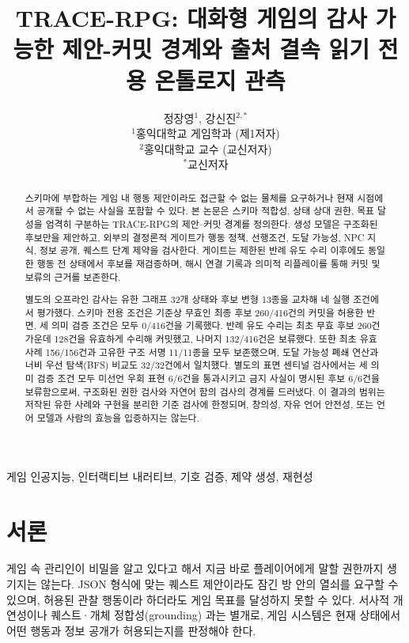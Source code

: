 \documentclass[journal]{IEEEtran}
\title{TRACE-RPG: 대화형 게임의 감사 가능한 제안-커밋 경계와 출처 결속 읽기 전용 온톨로지 관측}
\author{정장영$^{1}$, 강신진$^{2,*}$\\
\small $^{1}$홍익대학교 게임학과 (제1저자)\\
\small $^{2}$홍익대학교 교수 (교신저자)\\
\small $^{*}$교신저자}
\newcommand{\system}{TRACE-RPG}
\begin{document}
\maketitle

\begin{abstract}
스키마에 부합하는 게임 내 행동 제안이라도 접근할 수 없는 물체를 요구하거나 현재 시점에서 공개할 수 없는 사실을 포함할 수 있다. 본 논문은 스키마 적합성, 상태 상대 권한, 목표 달성을 엄격히 구분하는 \system{}의 제안--커밋 경계를 정의한다. 생성 모델은 구조화된 후보만을 제안하고, 외부의 결정론적 게이트가 행동 정책, 선행조건, 도달 가능성, NPC 지식, 정보 공개, 퀘스트 단계 제약을 검사한다. 게이트는 제한된 반례 유도 수리 이후에도 동일한 행동 전 상태에서 후보를 재검증하며, 해시 연결 기록과 의미적 리플레이를 통해 커밋 및 보류의 근거를 보존한다.

별도의 오프라인 감사는 유한 그래프 32개 상태와 후보 변형 13종을 교차해 네 실행 조건에서 평가했다. 스키마 전용 조건은 기준상 무효인 최종 후보 260/416건의 커밋을 허용한 반면, 세 의미 검증 조건은 모두 0/416건을 기록했다. 반례 유도 수리는 최초 무효 후보 260건 가운데 128건을 유효하게 수리해 커밋했고, 나머지 132/416건은 보류했다. 또한 최초 유효 사례 156/156건과 고유한 구조 서명 11/11종을 모두 보존했으며, 도달 가능성 폐쇄 연산과 너비 우선 탐색(BFS) 비교도 32/32건에서 일치했다. 별도의 표면 센티널 검사에서는 세 의미 검증 조건 모두 미선언 우회 표현 6/6건을 통과시키고 금지 사실이 명시된 후보 6/6건을 보류함으로써, 구조화된 권한 검사와 자연어 함의 검사의 경계를 드러냈다. 이 결과의 범위는 저작된 유한 사례와 구현을 분리한 기준 검사에 한정되며, 창의성, 자유 언어 안전성, 또는 언어 모델과 사람의 효능을 입증하지는 않는다.
\end{abstract}

\begin{IEEEkeywords}
게임 인공지능, 인터랙티브 내러티브, 기호 검증, 제약 생성, 재현성
\end{IEEEkeywords}

\section{서론}
게임 속 관리인이 비밀을 알고 있다고 해서 지금 바로 플레이어에게 말할 권한까지 생기지는 않는다. JSON 형식에 맞는 퀘스트 제안이라도 잠긴 방 안의 열쇠를 요구할 수 있으며, 허용된 관찰 행동이라 하더라도 게임 목표를 달성하지 못할 수 있다. 서사적 개연성이나 퀘스트·개체 정합성(grounding) \cite{S03_weir2024ontologically,S20_ashby2023personalized}과는 별개로, 게임 시스템은 현재 상태에서 어떤 행동과 정보 공개가 허용되는지를 판정해야 한다.
\end{document}
